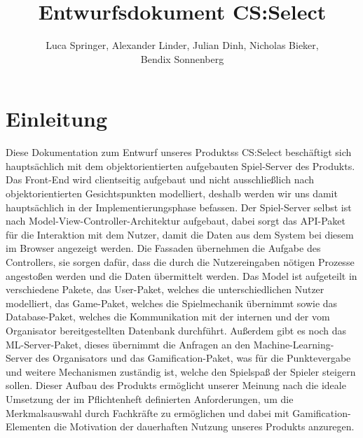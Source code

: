 \documentclass[a4paper]{scrreprt}
\begin{document}
    \title{Entwurfsdokument CS:Select}
    \author{Luca Springer, Alexander Linder, Julian Dinh, Nicholas Bieker,\\ Bendix Sonnenberg}
    \maketitle

    \tableofcontents


    \chapter{Einleitung}
    Diese Dokumentation zum Entwurf unseres Produktss CS:Select beschäftigt sich hauptsächlich mit dem objektorientierten aufgebauten Spiel-Server des Produkts. Das Front-End wird clientseitig aufgebaut und nicht ausschließlich nach objektorientierten Gesichtspunkten modelliert, deshalb werden wir uns damit hauptsächlich in der Implementierungsphase befassen.
    \newline
    \newline
    Der Spiel-Server selbst ist nach Model-View-Controller-Architektur aufgebaut, dabei sorgt das API-Paket für die Interaktion mit dem Nutzer, damit die Daten aus dem System bei diesem im Browser angezeigt werden. Die Fassaden übernehmen die Aufgabe des Controllers, sie sorgen dafür, dass die durch die Nutzereingaben nötigen Prozesse angestoßen werden und die Daten übermittelt werden. Das Model ist aufgeteilt in verschiedene Pakete, das User-Paket, welches die unterschiedlichen Nutzer modelliert, das Game-Paket, welches die Spielmechanik übernimmt sowie das Database-Paket, welches die Kommunikation mit der internen und der vom Organisator bereitgestellten Datenbank durchführt. Außerdem gibt es noch das ML-Server-Paket, dieses übernimmt die Anfragen an den Machine-Learning-Server des Organisators und das Gamification-Paket, was für die Punktevergabe und weitere Mechanismen zuständig ist, welche den Spielspaß der Spieler steigern sollen.
    \newline
    \newline
    Dieser Aufbau des Produkts ermöglicht unserer Meinung nach die ideale Umsetzung der im Pflichtenheft definierten Anforderungen, um die Merkmalsauswahl durch Fachkräfte zu ermöglichen und dabei mit Gamification-Elementen die Motivation der dauerhaften Nutzung unseres Produkts anzuregen.
\end{document}
